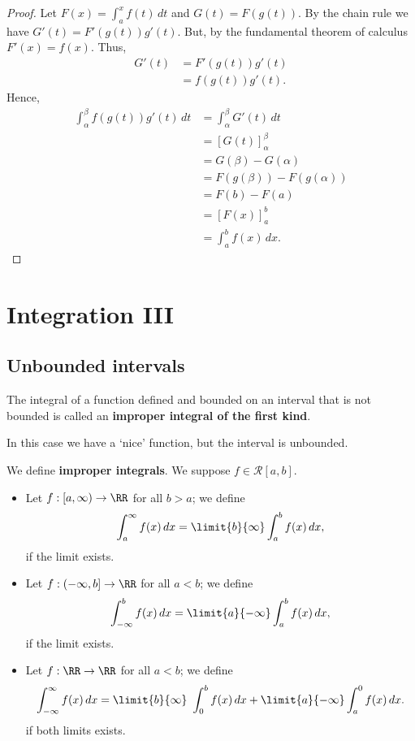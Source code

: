 \documentclass[12pt, a4paper]{article}
\begin{document}
\begin{proof}
    Let \(F(x)=\int_a^x f(t) \, dt\) and \(G(t)=F(g(t))\). By the chain rule we have \(G'(t)=F'(g(t))g'(t)\). But, by the fundamental theorem of calculus \(F'(x)=f(x)\). Thus,
    \[\begin{aligned}
        G'(t) &= F'(g(t))g'(t) \\
            &= f(g(t))g'(t).
    \end{aligned}\]
    Hence,
    \[\begin{aligned}
        \int_{\alpha}^{\beta} f(g(t))g'(t)\, dt &= \int_{\alpha}^{\beta} G'(t)\, dt \\
        &=[G(t)]_{\alpha}^{\beta} \\
        &=G(\beta) -G(\alpha) \\
        &=F(g(\beta))-F(g(\alpha)) \\
        &=F(b)-F(a) \\
        &=[F(x)]_a^b \\
        &=\int_a^b f(x) \, dx.
    \end{aligned}\]
\end{proof}

\section{Integration III}

\subsection{Unbounded intervals}

\begin{definition}
    The integral of a function defined and bounded on an interval that is not bounded is called an \textbf{improper integral of the first kind}.
\end{definition}

\begin{mdnote}
    In this case we have a `nice' function, but the interval is unbounded.
\end{mdnote}

\begin{definition}
    We define \textbf{improper integrals}. We suppose \(f \in \mathcal{R}[a,b]\).
    \begin{itemize}
        \item Let \(f :[a,\infty) \to \RR\) for all \(b>a\); we define
        \[\int_a^{\infty} f(x) \, dx =\limit{b}{\infty} \int_a^b f(x) \, dx,\]
        if the limit exists.
        \item Let \(f:(-\infty, b] \to \RR\) for all \(a<b\); we define
        \[\int_{-\infty}^{b} f(x) \, dx =\limit{a}{-\infty} \int_a^b f(x) \, dx,\]
        if the limit exists.
        \item Let \(f:\RR \to \RR\) for all \(a<b\); we define
        \[\int_{-\infty}^{\infty} f(x) \, dx = \limit{b}{\infty}\ \int_0^b f(x) \, dx+\limit{a}{-\infty} \int_a^0 f(x) \, dx.\]
        if both limits exists.
    \end{itemize}
\end{definition}
\end{document}
